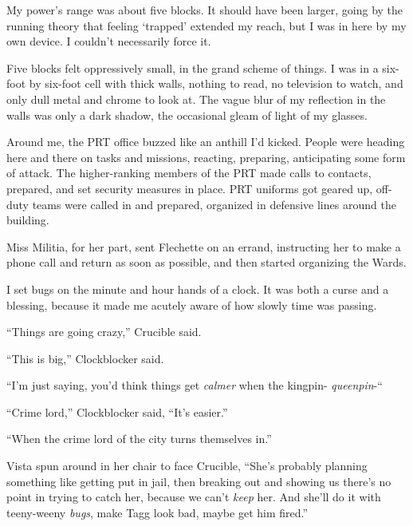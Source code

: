 My power's range was about five blocks.  It should have been larger, going by the running theory that feeling `trapped' extended my reach, but I was in here by my own device.  I couldn't necessarily force it.



Five blocks felt oppressively small, in the grand scheme of things.  I was in a six-foot by six-foot cell with thick walls, nothing to read, no television to watch, and only dull metal and chrome to look at.  The vague blur of my reflection in the walls was only a dark shadow, the occasional gleam of light of my glasses.



Around me, the PRT office buzzed like an anthill I'd kicked.  People were heading here and there on tasks and missions, reacting, preparing, anticipating some form of attack.  The higher-ranking members of the PRT made calls to contacts, prepared, and set security measures in place.  PRT uniforms got geared up, off-duty teams were called in and prepared, organized in defensive lines around the building.



Miss Militia, for her part, sent Flechette on an errand, instructing her to make a phone call and return as soon as possible, and then started organizing the Wards.



I set bugs on the minute and hour hands of a clock.  It was both a curse and a blessing, because it made me acutely aware of how slowly time was passing.



``Things are going crazy,'' Crucible said.



``This is big,'' Clockblocker said.



``I'm just saying, you'd think things get \emph{calmer }when the kingpin- \emph{queenpin}-``



``Crime lord,'' Clockblocker said, ``It's easier.''



``When the crime lord of the city turns themselves in.''



Vista spun around in her chair to face Crucible, ``She's probably planning something like getting put in jail, then breaking out and showing us there's no point in trying to catch her, because we can't \emph{keep} her.  And she'll do it with teeny-weeny \emph{bugs}, make Tagg look bad, maybe get him fired.''



